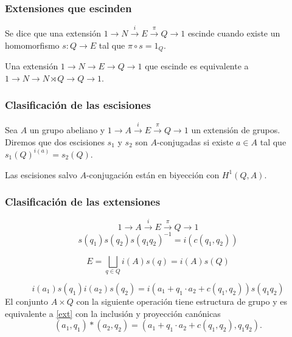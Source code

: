 \documentclass[
	11pt, %
]{beamer}
\newcommand{\homo}[3]{#1\colon #2\to #3}
\newcommand{\extension}[5]{1\xrightarrow{} #3 \xrightarrow{#1} #4\xrightarrow{#2} #5 \xrightarrow{} 1}
\begin{document}
\begin{frame}
	\frametitle{Extensiones que escinden}
	
	\begin{definition}
		Se dice que una extensión $\extension {i} {\pi} N E Q$ escinde cuando existe un homomorfismo $\homo s Q E$ tal que $\pi \circ s = 1_Q$. %
	\end{definition}
	
	\begin{theorem}
		Una extensión $\extension {}{} N E Q$ que escinde es equivalente a $\extension {}{} N {N\rtimes Q} Q$.
	\end{theorem}	
\end{frame}

\begin{frame}
	\frametitle{Clasificación de las escisiones}
	\begin{definition}
		Sea $A$ un grupo abeliano y $\extension i \pi A E Q$ un extensión de grupos. Diremos que dos escisiones $s_1$ y $s_2$ son $A$-conjugadas si existe $a\in A$ tal que $s_1(Q)^{i(a)} = s_2(Q)$.
	\end{definition}
	
	\begin{theorem}
		Las escisiones salvo $A$-conjugación están en biyección con $H^1(Q,A)$.
	\end{theorem}
\end{frame}

\begin{frame}
	\frametitle{Clasificación de las extensiones}
	
	\begin{equation}\label{ext}
		\extension i \pi A E Q
	\end{equation}
	\begin{equation*}
		s(q_1)s(q_2)s(q_1q_2)^{-1} = i(c(q_1,q_2))
	\end{equation*}
	
	$$	
		E = \bigsqcup_{q\in Q} i(A)s(q) = i(A)s(Q)
	$$
	
	$$
		i(a_1)s(q_1)i(a_2)s(q_2) = %
		i(a_1+q_1\cdot a_2 + c(q_1,q_2))s(q_1q_2)
	$$
	El conjunto $A\times Q$ con la siguiente operación tiene estructura de grupo y es equivalente a \eqref{ext} con la inclusión y proyección canónicas
	\begin{equation}\label{op}
		(a_1,q_1)*(a_2,q_2) = (a_1+q_1\cdot a_2 + c(q_1,q_2),q_1q_2). 
	\end{equation}
\end{frame}
\end{document}
